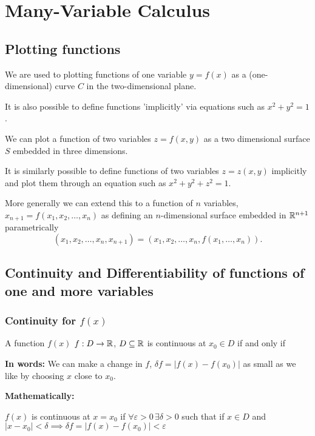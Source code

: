 \documentclass[10pt, a4paper]{article}
\begin{document}
\newpage

\section{Many-Variable Calculus}

\subsection{Plotting functions}
We are used to plotting functions of one variable $y = f(x)$ as a
(one-dimensional)
curve $C$ in the two-dimensional plane.

It is also possible to define functions 'implicitly' via equations such as $x ^ 2 + y ^ 2 = 1$.

We can plot a function of two variables $z = f(x, y)$ as a two dimensional surface $S$ embedded in three dimensions.

It is similarly possible to define functions of two variables $z = z(x, y)$ implicitly and plot them through an equation such as $x ^ 2 + y ^ 2 + z ^ 2 = 1$.

More generally we can extend this to a function of $n$ variables,
$x_{n + 1} = f(x_1, x_2, \dotsc, x_n)$ as defining an $n$-dimensional surface embedded in $\mathbb{R} ^ {n + 1}$ parametrically
\[
(x_1, x_2, \dotsc, x_n, x_{n + 1}) = (x_1, x_2, \dotsc, x_n, f(x_1, \dotsc, x_n)).
\]

\subsection{Continuity and Differentiability of functions of one and more variables}

\subsubsection{Continuity for \texorpdfstring{$f(x)$}{}}
A function $f(x)$ $f : D \rightarrow \mathbb{R}$,
$D \subseteq \mathbb{R}$ is continuous at $x_0 \in D$ if and only if

\textbf{In words:}
We can make a change in $f$,
$\delta f = |f(x) - f(x_0)|$ as small as we like by choosing $x$ close to $x_0$.

\textbf{Mathematically:}
\begin{definition}[Continuity]
    $f(x)$ is continuous at $x = x_0$ if $\forall \varepsilon > 0\,\exists \delta > 0$ such that if $x \in D$ and $|x - x_0| < \delta \implies \delta f = |f(x) - f(x_0)| < \varepsilon$
\end{definition}
\end{document}
